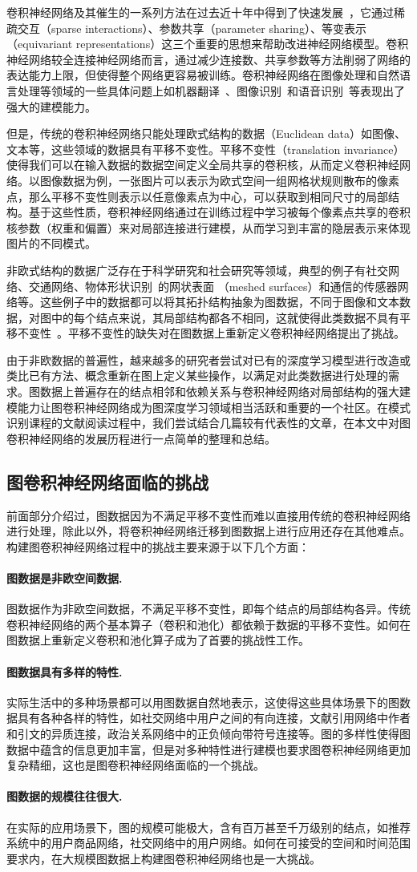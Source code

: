 \documentclass[final]{cvpr}
\newcommand{\mypara}[1]{\paragraph{#1.}}
\begin{document}
卷积神经网络及其催生的一系列方法在过去近十年中得到了快速发展~\cite{he2016deep,ioffe2015batch,krizhevsky2012imagenet,simonyan2014very}，它通过稀疏交互（sparse interactions）、参数共享（parameter sharing）、等变表示（equivariant representations）这三个重要的思想来帮助改进神经网络模型。卷积神经网络较全连接神经网络而言，通过减少连接数、共享参数等方法削弱了网络的表达能力上限，但使得整个网络更容易被训练。卷积神经网络在图像处理和自然语言处理等领域的一些具体问题上如机器翻译~\cite{hu2014convolutional}、图像识别~\cite{he2016deep}和语音识别~\cite{hinton2012deep}等表现出了强大的建模能力。

但是，传统的卷积神经网络只能处理欧式结构的数据（Euclidean data）如图像、文本等，这些领域的数据具有平移不变性。平移不变性（translation invariance） 使得我们可以在输入数据的数据空间定义全局共享的卷积核，从而定义卷积神经网络。以图像数据为例，一张图片可以表示为欧式空间一组网格状规则散布的像素点，那么平移不变性则表示以任意像素点为中心，可以获取到相同尺寸的局部结构。基于这些性质，卷积神经网络通过在训练过程中学习被每个像素点共享的卷积核参数（权重和偏置）来对局部连接进行建模，从而学习到丰富的隐层表示来体现图片的不同模式。

非欧式结构的数据广泛存在于科学研究和社会研究等领域，典型的例子有社交网络、交通网络、物体形状识别~\cite{mirbauer2021survey}的网状表面
（meshed surfaces）和通信的传感器网络等。这些例子中的数据都可以将其拓扑结构抽象为图数据，不同于图像和文本数据，对图中的每个结点来说，其局部结构都各不相同，这就使得此类数据不具有平移不变性~\cite{shuman2013emerging}。平移不变性的缺失对在图数据上重新定义卷积神经网络提出了挑战。

由于非欧数据的普遍性，越来越多的研究者尝试对已有的深度学习模型进行改造或类比已有方法、概念重新在图上定义某些操作，以满足对此类数据进行处理的需求。图数据上普遍存在的结点相邻和依赖关系与卷积神经网络对局部结构的强大建模能力让图卷积神经网络成为图深度学习领域相当活跃和重要的一个社区。在模式识别课程的文献阅读过程中，我们尝试结合几篇较有代表性的文章，在本文中对图卷积神经网络的发展历程进行一点简单的整理和总结。

\subsection{图卷积神经网络面临的挑战}
前面部分介绍过，图数据因为不满足平移不变性而难以直接用传统的卷积神经网络进行处理，除此以外，将卷积神经网络迁移到图数据上进行应用还存在其他难点。构建图卷积神经网络过程中的挑战主要来源于以下几个方面：
\mypara{图数据是非欧空间数据}
图数据作为非欧空间数据，不满足平移不变性，即每个结点的局部结构各异。传统卷积神经网络的两个基本算子（卷积和池化）都依赖于数据的平移不变性。如何在图数据上重新定义卷积和池化算子成为了首要的挑战性工作。
\mypara{图数据具有多样的特性}
实际生活中的多种场景都可以用图数据自然地表示，这使得这些具体场景下的图数据具有各种各样的特性，如社交网络中用户之间的有向连接，文献引用网络中作者和引文的异质连接，政治关系网络中的正负倾向带符号连接等。图的多样性使得图数据中蕴含的信息更加丰富，但是对多种特性进行建模也要求图卷积神经网络更加复杂精细，这也是图卷积神经网络面临的一个挑战。
\mypara{图数据的规模往往很大}
在实际的应用场景下，图的规模可能极大，含有百万甚至千万级别的结点，如推荐系统中的用户商品网络，社交网络中的用户网络。如何在可接受的空间和时间范围要求内，在大规模图数据上构建图卷积神经网络也是一大挑战。
\end{document}

